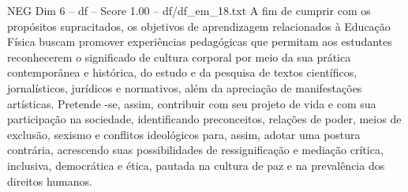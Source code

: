 \begin{textsample}{NEG Dim 6 – df – Score 1.00 – df/df\_em\_18.txt}
A fim de cumprir com os propósitos supracitados, os objetivos de aprendizagem relacionados à Educação Física buscam promover experiências pedagógicas que permitam aos estudantes reconhecerem o significado de cultura corporal por meio da sua prática contemporânea e histórica, do estudo e da pesquisa de textos científicos, jornalísticos, jurídicos e normativos, além da apreciação de manifestações artísticas.
Pretende -se, assim, contribuir com seu projeto de vida e com sua participação na sociedade, identificando preconceitos, relações de poder, meios de exclusão, sexismo e conflitos ideológicos para, assim, adotar uma postura contrária, acrescendo suas possibilidades de ressignificação e mediação crítica, inclusiva, democrática e ética, pautada na cultura de paz e na prevalência dos direitos humanos.

\end{textsample}
